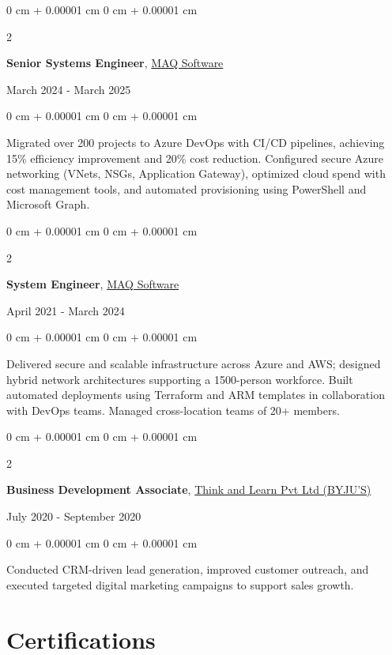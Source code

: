 \documentclass[10pt, letterpaper]{article}
\newenvironment{onecolentry}{
    \begin{adjustwidth}{
        0 cm + 0.00001 cm
    }{
        0 cm + 0.00001 cm
    }
}{
    \end{adjustwidth}
}
\newenvironment{twocolentry}[2][]{
    \onecolentry
    \def\secondColumn{#2}
    \setcolumnwidth{\fill, 4.5 cm}
    \begin{paracol}{2}
}{
    \switchcolumn \raggedleft \secondColumn
    \end{paracol}
    \endonecolentry
}
\begin{document}
\vspace{0.2 cm}

\begin{twocolentry}{March 2024 - March 2025}
    \textbf{Senior Systems Engineer}, \href{https://maqsoftware.com/}{MAQ Software}
\end{twocolentry}

\vspace{0.10 cm}
\begin{onecolentry}
    Migrated over 200 projects to Azure DevOps with CI/CD pipelines, achieving 15\% efficiency improvement and 20\% cost reduction. Configured secure Azure networking (VNets, NSGs, Application Gateway), optimized cloud spend with cost management tools, and automated provisioning using PowerShell and Microsoft Graph.
\end{onecolentry}

\vspace{0.2 cm}

\begin{twocolentry}{April 2021 - March 2024}
    \textbf{System Engineer}, \href{https://maqsoftware.com/}{MAQ Software}
\end{twocolentry}

\vspace{0.10 cm}
\begin{onecolentry}
    Delivered secure and scalable infrastructure across Azure and AWS; designed hybrid network architectures supporting a 1500-person workforce. Built automated deployments using Terraform and ARM templates in collaboration with DevOps teams. Managed cross-location teams of 20+ members.
\end{onecolentry}

\vspace{0.2 cm}

\begin{twocolentry}{July 2020 - September 2020}
    \textbf{Business Development Associate}, \href{https://byjus.com/}{Think and Learn Pvt Ltd (BYJU'S)}
\end{twocolentry}

\vspace{0.10 cm}
\begin{onecolentry}
    Conducted CRM-driven lead generation, improved customer outreach, and executed targeted digital marketing campaigns to support sales growth.
\end{onecolentry}


\section{Certifications}
\end{document}

